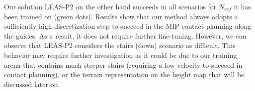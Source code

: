 Our solution LEAS-P2 on the other hand succeeds in all scenarios for $N_{ref}$ it has been trained on (green dots).
Results show that our method always adopts a sufficiently high discretization step to succeed in the MIP contact planning along the guides. %
As a result, it does not require further fine-tuning.
However, we can observe that LEAS-P2 considers the stairs (down) scenario as difficult.
This behavior may require further investigation as it could be due to our training arena that contains much steeper stairs (requiring a low velocity to succeed in contact planning), or the terrain representation on the height map that will be discussed later on.

